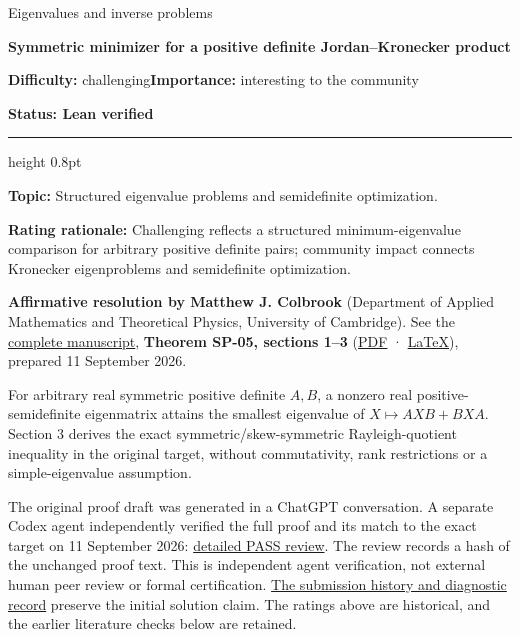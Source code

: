 \documentclass[11pt,a4paper]{article}
\makeatletter
\renewcommand{\subsection}{\Needspace{4\baselineskip}\@startsection{subsection}{2}{0pt}{9pt plus 1pt minus 1pt}{3pt}{\sffamily\bfseries\normalsize\color{ink}}}
\makeatother
\begin{document}
{\sffamily\small\color{muted}Eigenvalues and inverse problems\par}
\vspace{3pt}
{\raggedright{}\sffamily\bfseries\fontsize{21}{24}\selectfont\color{ink}Symmetric
minimizer for a positive definite Jordan--Kronecker product\par}
\vspace{7pt}
{\sffamily\small\textbf{Difficulty:} challenging\quad\textbf{Importance:} interesting
to the community\par}
{\sffamily\small\bfseries\color{accent}Status: Lean verified\par}
\vspace{4pt}
{\color{accent}\hrule height 0.8pt}
\vspace{6pt}
\textbf{Topic:} Structured eigenvalue problems and semidefinite
optimization.

\textbf{Rating rationale:} Challenging reflects a structured
minimum-eigenvalue comparison for arbitrary positive definite pairs;
community impact connects Kronecker eigenproblems and semidefinite
optimization.

\subsection{Resolution --- 2026-09-11}\label{resolution-2026-09-11}

\textbf{Affirmative resolution by Matthew J. Colbrook} (Department of
Applied Mathematics and Theoretical Physics, University of Cambridge).
See the
\href{https://github.com/ajt60gaibb/OpenProblemsInNLA/blob/main/eigenvalues-and-inverse-problems/SP-05/solution.md}{complete
manuscript}, \textbf{Theorem SP-05, sections 1--3}
(\href{https://github.com/ajt60gaibb/OpenProblemsInNLA/blob/main/eigenvalues-and-inverse-problems/SP-05/solution.pdf}{PDF}
·
\href{https://github.com/ajt60gaibb/OpenProblemsInNLA/blob/main/eigenvalues-and-inverse-problems/SP-05/solution.tex}{LaTeX}),
prepared 11 September 2026.

For arbitrary real symmetric positive definite \(A,B\), a nonzero real
positive-semidefinite eigenmatrix attains the smallest eigenvalue of
\(X\mapsto AXB+BXA\). Section 3 derives the exact
symmetric/skew-symmetric Rayleigh-quotient inequality in the original
target, without commutativity, rank restrictions or a simple-eigenvalue
assumption.

The original proof draft was generated in a ChatGPT conversation. A
separate Codex agent independently verified the full proof and its match
to the exact target on 11 September 2026:
\href{https://github.com/ajt60gaibb/OpenProblemsInNLA/blob/main/references/colbrook-2026-09-11/verification/reviews/SP-05-review.md}{detailed
PASS review}. The review records a hash of the unchanged proof text.
This is independent agent verification, not external human peer review
or formal certification.
\href{https://github.com/ajt60gaibb/OpenProblemsInNLA/blob/main/references/colbrook-2026-09-11/README.md}{The
submission history and diagnostic record} preserve the initial solution
claim. The ratings above are historical, and the earlier literature
checks below are retained.
\end{document}
